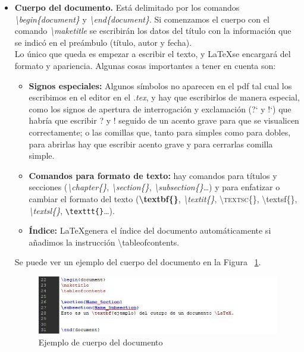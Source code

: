 \documentclass[a4paper, 12pt]{book}
\begin{document}
\begin{itemize}
	\item \textbf{Cuerpo del documento.} Está delimitado por los comandos \textit{\textbackslash begin\{document\}} y \textit{\textbackslash end\{document\}}. Si comenzamos el cuerpo con el comando \textit{\textbackslash maketitle} se escribirán los datos del título con la información que se indicó en el preámbulo (título, autor y fecha).\\
	Lo único que queda es empezar a escribir el texto, y \LaTeX se encargará del formato y apariencia. Algunas cosas importantes a tener en cuenta son: 
	\begin{itemize}
		\item \textbf{Signos especiales:} Algunos símbolos no aparecen en el pdf tal cual los escribimos en el editor en el \textit{.tex}, y hay que escribirlos de manera especial, como los signos de apertura de interrogación y exclamación (?` y !`) que habría que escribir ? y ! seguido de un acento grave para que se visualicen correctamente; o las comillas que, tanto para simples como para dobles, para abrirlas hay que escribir acento grave y para cerrarlas comilla simple.
		\item \textbf{Comandos para formato de texto:} hay comandos para títulos y secciones (\mbox{\textit{\textbackslash chapter\{\}}}, \textit{\textbackslash section\{\}}, \textit{\textbackslash subsection\{\}}\ldots) y para enfatizar o cambiar el formato del texto (\textbf{\textbackslash textbf\{\}}, \textit{\textbackslash textit\{\}}, \textsc{\textbackslash textsc\{\}}, \textsf{\textbackslash textsf\{\}}, \textsl{\textbackslash textsl\{\}}, \texttt{\textbackslash texttt\{\}}\ldots).
		\item \textbf{Índice:} \LaTeX genera el índice del documento automáticamente si añadimos la instrucción \textbackslash tableofcontents.
	\end{itemize}
	
	Se puede ver un ejemplo del cuerpo del documento en la Figura ~\ref{fig:cuerpo}.	
	
	\begin{figure}[h!]
		\centering
		\includegraphics[width=13cm, keepaspectratio]{img/cuerpo_latex}
		\caption{Ejemplo de cuerpo del documento}
		\label{fig:cuerpo}
	\end{figure}
	
\end{itemize}
\end{document}

